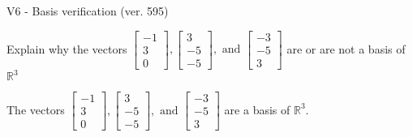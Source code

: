\begin{exercise}
  \begin{exerciseTitle}V6 - Basis verification (ver. 595)\end{exerciseTitle}
  \begin{exerciseStatement}
    Explain why the vectors \(\left[\begin{array}{r}
-1 \\
3 \\
0
\end{array}\right] , \left[\begin{array}{r}
3 \\
-5 \\
-5
\end{array}\right] , \text{ and } \left[\begin{array}{r}
-3 \\
-5 \\
3
\end{array}\right]\) are or are not a basis of \(\mathbb{R}^3\)	


  \end{exerciseStatement}
  \begin{exerciseAnswer}
   The vectors \(\left[\begin{array}{r}
-1 \\
3 \\
0
\end{array}\right] , \left[\begin{array}{r}
3 \\
-5 \\
-5
\end{array}\right] , \text{ and } \left[\begin{array}{r}
-3 \\
-5 \\
3
\end{array}\right]\) 
  	 are  a basis of \(\mathbb{R}^3\).
  


  \end{exerciseAnswer}
\end{exercise}